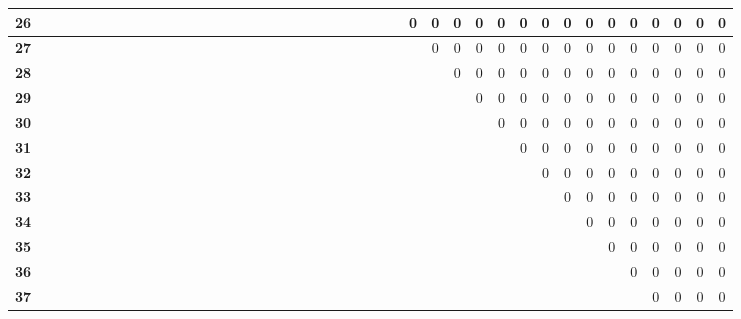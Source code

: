 \documentclass{article}
\begin{document}
\begin{table}[!ht]
\begin{adjustwidth}{-3cm}{-3cm}
\begin{tabular}{c||c|c|c|c|c|c|c|c|c|c|c|c|c|c|c|c|c|c|c|c|c|c|c|c|c|c|c|c|c|c|c|c|c|c|c|c|c|c|c|c|c|}
\multicolumn{1}{|c||}{\cellcolor{gray90}\textbf{26}} &  &  &  &  &  &  &  &  &  &  &  &  &  &  &  &  &  &  &  &  &  &  &  &  &  &  & 0 & 0 & 0 & 0 & 0 & 0 & 0 & 0 & 0 & 0 & 0 & 0 & 0 & 0 & 0 \\ \hline
\multicolumn{1}{|c||}{\cellcolor{gray90}\textbf{27}} &  &  &  &  &  &  &  &  &  &  &  &  &  &  &  &  &  &  &  &  &  &  &  &  &  &  &  & 0 & 0 & 0 & 0 & 0 & 0 & 0 & 0 & 0 & 0 & 0 & 0 & 0 & 0 \\ \hline
\multicolumn{1}{|c||}{\cellcolor{gray90}\textbf{28}} &  &  &  &  &  &  &  &  &  &  &  &  &  &  &  &  &  &  &  &  &  &  &  &  &  &  &  &  & 0 & 0 & 0 & 0 & 0 & 0 & 0 & 0 & 0 & 0 & 0 & 0 & 0 \\ \hline
\multicolumn{1}{|c||}{\cellcolor{gray90}\textbf{29}} &  &  &  &  &  &  &  &  &  &  &  &  &  &  &  &  &  &  &  &  &  &  &  &  &  &  &  &  &  & 0 & 0 & 0 & 0 & 0 & 0 & 0 & 0 & 0 & 0 & 0 & 0 \\ \hline
\multicolumn{1}{|c||}{\cellcolor{gray90}\textbf{30}} &  &  &  &  &  &  &  &  &  &  &  &  &  &  &  &  &  &  &  &  &  &  &  &  &  &  &  &  &  &  & 0 & 0 & 0 & 0 & 0 & 0 & 0 & 0 & 0 & 0 & 0 \\ \hline
\multicolumn{1}{|c||}{\cellcolor{gray90}\textbf{31}} &  &  &  &  &  &  &  &  &  &  &  &  &  &  &  &  &  &  &  &  &  &  &  &  &  &  &  &  &  &  &  & 0 & 0 & 0 & 0 & 0 & 0 & 0 & 0 & 0 & 0 \\ \hline
\multicolumn{1}{|c||}{\cellcolor{gray90}\textbf{32}} &  &  &  &  &  &  &  &  &  &  &  &  &  &  &  &  &  &  &  &  &  &  &  &  &  &  &  &  &  &  &  &  & 0 & 0 & 0 & 0 & 0 & 0 & 0 & 0 & 0 \\ \hline
\multicolumn{1}{|c||}{\cellcolor{gray90}\textbf{33}} &  &  &  &  &  &  &  &  &  &  &  &  &  &  &  &  &  &  &  &  &  &  &  &  &  &  &  &  &  &  &  &  &  & 0 & 0 & 0 & 0 & 0 & 0 & 0 & 0 \\ \hline
\multicolumn{1}{|c||}{\cellcolor{gray90}\textbf{34}} &  &  &  &  &  &  &  &  &  &  &  &  &  &  &  &  &  &  &  &  &  &  &  &  &  &  &  &  &  &  &  &  &  &  & 0 & 0 & 0 & 0 & 0 & 0 & 0 \\ \hline
\multicolumn{1}{|c||}{\cellcolor{gray90}\textbf{35}} &  &  &  &  &  &  &  &  &  &  &  &  &  &  &  &  &  &  &  &  &  &  &  &  &  &  &  &  &  &  &  &  &  &  &  & 0 & 0 & 0 & 0 & 0 & 0 \\ \hline
\multicolumn{1}{|c||}{\cellcolor{gray90}\textbf{36}} &  &  &  &  &  &  &  &  &  &  &  &  &  &  &  &  &  &  &  &  &  &  &  &  &  &  &  &  &  &  &  &  &  &  &  &  & 0 & 0 & 0 & 0 & 0 \\ \hline
\multicolumn{1}{|c||}{\cellcolor{gray90}\textbf{37}} &  &  &  &  &  &  &  &  &  &  &  &  &  &  &  &  &  &  &  &  &  &  &  &  &  &  &  &  &  &  &  &  &  &  &  &  &  & 0 & 0 & 0 & 0 \\ \hline

\end{tabular}
\end{adjustwidth}
\end{table}
\end{document}
